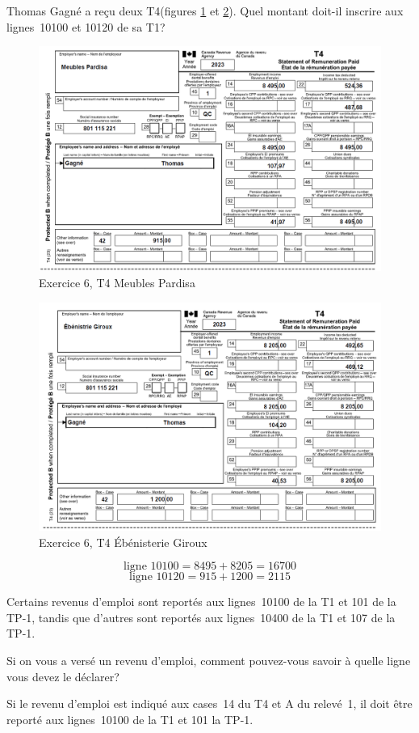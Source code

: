 \begin{question}
	 Thomas Gagné a reçu deux T4(figures \ref{fig:Chap2Exercice6Q2T4numero1} et \ref{fig:Chap2Exercice6Q2T4numero2}). Quel montant doit-il inscrire aux lignes~10100 et 10120 de sa T1?
	\begin{figure}
		\centering
		\includegraphics[width=.9\textwidth]{exercice/2-6/Q2/T4-1.png}
		\caption{Exercice 6, T4 Meubles Pardisa}
		\label{fig:Chap2Exercice6Q2T4numero1}
	\end{figure}
	\begin{figure}
		\centering
		\includegraphics[width=.9\textwidth]{exercice/2-6/Q2/T4-2.png}
		\caption{Exercice 6, T4 Ébénisterie Giroux}
		\label{fig:Chap2Exercice6Q2T4numero2}
	\end{figure}
\end{question}
\[ \text{ligne~10100} = 8495 + 8205 = 16700\]
\[ \text{ligne~10120} = 915 + 1200 = 2115\]

\begin{question}
	Certains revenus d'emploi sont reportés aux lignes~10100 de la T1 et 101 de la TP-1, tandis que d'autres sont reportés aux lignes~10400 de la T1 et 107 de la TP-1. 
	
	Si on vous a versé un revenu d'emploi, comment pouvez-vous savoir à quelle ligne vous devez le déclarer?
\end{question}
Si le revenu d'emploi est indiqué aux cases~14 du T4 et A du relevé~1, il doit être reporté aux lignes~10100 de la T1 et 101 la TP-1.

